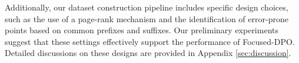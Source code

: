 Additionally, our dataset construction pipeline includes specific design choices, such as the use of a page-rank mechanism and the identification of error-prone points based on common prefixes and suffixes. 
Our preliminary experiments suggest that these settings effectively support the performance of Focused-DPO. Detailed discussions on these designs are provided in Appendix \ref{sec:discussion}.







